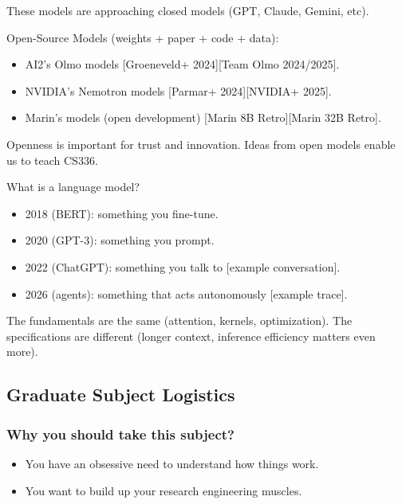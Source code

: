 \documentclass[12pt,twoside]{article}
\begin{document}
\begin{claim}
    These models are approaching closed models (GPT, Claude, Gemini, etc).
\end{claim}

Open-Source Models (weights + paper + code + data):

\begin{itemize}
    \item AI2's Olmo models [Groeneveld+ 2024][Team Olmo 2024/2025].
    \item NVIDIA's Nemotron models [Parmar+ 2024][NVIDIA+ 2025].
    \item Marin's models (open development) [Marin 8B Retro][Marin 32B Retro].
\end{itemize}

Openness is important for trust and innovation. Ideas from open models enable us to teach CS336.

\begin{question}
    What is a language model?
\end{question}

\begin{itemize}
    \item 2018 (BERT): something you fine-tune.
    \item 2020 (GPT-3): something you prompt.
    \item 2022 (ChatGPT): something you talk to [example conversation].
    \item 2026 (agents): something that acts autonomously [example trace].
\end{itemize}

The fundamentals are the same (attention, kernels, optimization). The specifications are different (longer context, inference efficiency matters even more).

\subsection*{Graduate Subject Logistics}

\subsubsection*{Why you should take this subject?}

\begin{itemize}
    \item You have an obsessive need to understand how things work.
    \item You want to build up your research engineering muscles.
\end{itemize}
\end{document}
